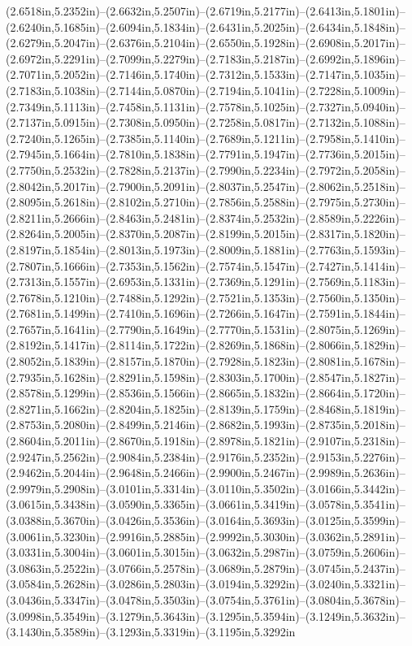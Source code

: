 (2.6518in,5.2352in)--(2.6632in,5.2507in)--(2.6719in,5.2177in)--(2.6413in,5.1801in)--(2.6240in,5.1685in)--(2.6094in,5.1834in)--(2.6431in,5.2025in)--(2.6434in,5.1848in)--(2.6279in,5.2047in)--(2.6376in,5.2104in)--(2.6550in,5.1928in)--(2.6908in,5.2017in)--(2.6972in,5.2291in)--(2.7099in,5.2279in)--(2.7183in,5.2187in)--(2.6992in,5.1896in)--(2.7071in,5.2052in)--(2.7146in,5.1740in)--(2.7312in,5.1533in)--(2.7147in,5.1035in)--(2.7183in,5.1038in)--(2.7144in,5.0870in)--(2.7194in,5.1041in)--(2.7228in,5.1009in)--(2.7349in,5.1113in)--(2.7458in,5.1131in)--(2.7578in,5.1025in)--(2.7327in,5.0940in)--(2.7137in,5.0915in)--(2.7308in,5.0950in)--(2.7258in,5.0817in)--(2.7132in,5.1088in)--(2.7240in,5.1265in)--(2.7385in,5.1140in)--(2.7689in,5.1211in)--(2.7958in,5.1410in)--(2.7945in,5.1664in)--(2.7810in,5.1838in)--(2.7791in,5.1947in)--(2.7736in,5.2015in)--(2.7750in,5.2532in)--(2.7828in,5.2137in)--(2.7990in,5.2234in)--(2.7972in,5.2058in)--(2.8042in,5.2017in)--(2.7900in,5.2091in)--(2.8037in,5.2547in)--(2.8062in,5.2518in)--(2.8095in,5.2618in)--(2.8102in,5.2710in)--(2.7856in,5.2588in)--(2.7975in,5.2730in)--(2.8211in,5.2666in)--(2.8463in,5.2481in)--(2.8374in,5.2532in)--(2.8589in,5.2226in)--(2.8264in,5.2005in)--(2.8370in,5.2087in)--(2.8199in,5.2015in)--(2.8317in,5.1820in)--(2.8197in,5.1854in)--(2.8013in,5.1973in)--(2.8009in,5.1881in)--(2.7763in,5.1593in)--(2.7807in,5.1666in)--(2.7353in,5.1562in)--(2.7574in,5.1547in)--(2.7427in,5.1414in)--(2.7313in,5.1557in)--(2.6953in,5.1331in)--(2.7369in,5.1291in)--(2.7569in,5.1183in)--(2.7678in,5.1210in)--(2.7488in,5.1292in)--(2.7521in,5.1353in)--(2.7560in,5.1350in)--(2.7681in,5.1499in)--(2.7410in,5.1696in)--(2.7266in,5.1647in)--(2.7591in,5.1844in)--(2.7657in,5.1641in)--(2.7790in,5.1649in)--(2.7770in,5.1531in)--(2.8075in,5.1269in)--(2.8192in,5.1417in)--(2.8114in,5.1722in)--(2.8269in,5.1868in)--(2.8066in,5.1829in)--(2.8052in,5.1839in)--(2.8157in,5.1870in)--(2.7928in,5.1823in)--(2.8081in,5.1678in)--(2.7935in,5.1628in)--(2.8291in,5.1598in)--(2.8303in,5.1700in)--(2.8547in,5.1827in)--(2.8578in,5.1299in)--(2.8536in,5.1566in)--(2.8665in,5.1832in)--(2.8664in,5.1720in)--(2.8271in,5.1662in)--(2.8204in,5.1825in)--(2.8139in,5.1759in)--(2.8468in,5.1819in)--(2.8753in,5.2080in)--(2.8499in,5.2146in)--(2.8682in,5.1993in)--(2.8735in,5.2018in)--(2.8604in,5.2011in)--(2.8670in,5.1918in)--(2.8978in,5.1821in)--(2.9107in,5.2318in)--(2.9247in,5.2562in)--(2.9084in,5.2384in)--(2.9176in,5.2352in)--(2.9153in,5.2276in)--(2.9462in,5.2044in)--(2.9648in,5.2466in)--(2.9900in,5.2467in)--(2.9989in,5.2636in)--(2.9979in,5.2908in)--(3.0101in,5.3314in)--(3.0110in,5.3502in)--(3.0166in,5.3442in)--(3.0615in,5.3438in)--(3.0590in,5.3365in)--(3.0661in,5.3419in)--(3.0578in,5.3541in)--(3.0388in,5.3670in)--(3.0426in,5.3536in)--(3.0164in,5.3693in)--(3.0125in,5.3599in)--(3.0061in,5.3230in)--(2.9916in,5.2885in)--(2.9992in,5.3030in)--(3.0362in,5.2891in)--(3.0331in,5.3004in)--(3.0601in,5.3015in)--(3.0632in,5.2987in)--(3.0759in,5.2606in)--(3.0863in,5.2522in)--(3.0766in,5.2578in)--(3.0689in,5.2879in)--(3.0745in,5.2437in)--(3.0584in,5.2628in)--(3.0286in,5.2803in)--(3.0194in,5.3292in)--(3.0240in,5.3321in)--(3.0436in,5.3347in)--(3.0478in,5.3503in)--(3.0754in,5.3761in)--(3.0804in,5.3678in)--(3.0998in,5.3549in)--(3.1279in,5.3643in)--(3.1295in,5.3594in)--(3.1249in,5.3632in)--(3.1430in,5.3589in)--(3.1293in,5.3319in)--(3.1195in,5.3292in